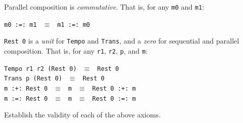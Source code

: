 \begin{axiom}
Parallel composition is {\em commutative}.  That is, for any {\tt m0}
and {\tt m1}:
\begin{center}
{\tt m0 :=:\ m1} $\ \ \equiv\ \ $ {\tt m1 :=:\ m0}
\end{center}
\end{axiom}
\begin{axiom}
{\tt Rest 0} is a {\em unit} for {\tt Tempo} and {\tt Trans}, and a
{\em zero} for sequential and parallel composition.  That is, for any
{\tt r1}, {\tt r2}, {\tt p}, and {\tt m}:
\begin{center}
{\tt Tempo r1 r2 (Rest 0)} $\ \ \equiv\ \ $ {\tt Rest 0}\\
{\tt Trans p (Rest 0)} $\ \ \equiv\ \ $ {\tt Rest 0}\\
{\tt m :+:\ Rest 0} $\ \ \equiv\ \ $ {\tt m} $\ \ \equiv\ \ $ {\tt Rest 0 :+:\ m}\\
{\tt m :=:\ Rest 0} $\ \ \equiv\ \ $ {\tt m} $\ \ \equiv\ \ $ {\tt Rest 0 :=:\ m} 
\end{center}
\end{axiom}

\begin{exercise} Establish the validity of each of the above axioms.
\end{exercise}

